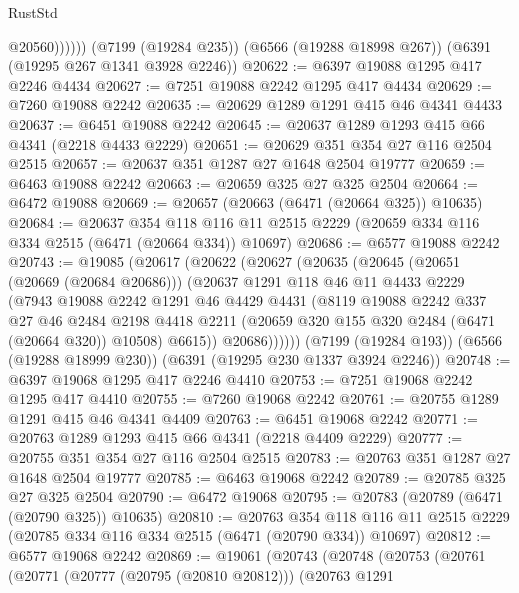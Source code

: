 \begin{lexlean}{RustStd}
\begin{coremodule}
                @20560))))))
    (@7199 (@19284 @235))
    (@6566 (@19288 @18998 @267))
    (@6391 (@19295 @267 @1341 @3928 @2246))
@20622 := @6397 @19088 @1295 @417 @2246 @4434
@20627 := @7251 @19088 @2242 @1295 @417 @4434
@20629 := @7260 @19088 @2242
@20635 := @20629 @1289 @1291 @415 @46 @4341 @4433
@20637 := @6451 @19088 @2242
@20645 := @20637 @1289 @1293 @415 @66 @4341 (@2218 @4433 @2229)
@20651 := @20629 @351 @354 @27 @116 @2504 @2515
@20657 := @20637 @351 @1287 @27 @1648 @2504 @19777
@20659 := @6463 @19088 @2242
@20663 := @20659 @325 @27 @325 @2504
@20664 := @6472 @19088
@20669 := @20657 (@20663 (@6471 (@20664 @325)) @10635)
@20684 := @20637
    @354
    @118
    @116
    @11
    @2515
    @2229
    (@20659 @334 @116 @334 @2515 (@6471 (@20664 @334)) @10697)
@20686 := @6577 @19088 @2242
@20743 := @19085
    (@20617
      (@20622
        (@20627
          (@20635
            (@20645
              (@20651 (@20669 (@20684 @20686)))
              (@20637
                @1291
                @118
                @46
                @11
                @4433
                @2229
                (@7943
                  @19088
                  @2242
                  @1291
                  @46
                  @4429
                  @4431
                  (@8119
                    @19088
                    @2242
                    @337
                    @27
                    @46
                    @2484
                    @2198
                    @4418
                    @2211
                    (@20659 @320 @155 @320 @2484 (@6471 (@20664 @320)) @10508)
                    @6615))
                @20686))))))
    (@7199 (@19284 @193))
    (@6566 (@19288 @18999 @230))
    (@6391 (@19295 @230 @1337 @3924 @2246))
@20748 := @6397 @19068 @1295 @417 @2246 @4410
@20753 := @7251 @19068 @2242 @1295 @417 @4410
@20755 := @7260 @19068 @2242
@20761 := @20755 @1289 @1291 @415 @46 @4341 @4409
@20763 := @6451 @19068 @2242
@20771 := @20763 @1289 @1293 @415 @66 @4341 (@2218 @4409 @2229)
@20777 := @20755 @351 @354 @27 @116 @2504 @2515
@20783 := @20763 @351 @1287 @27 @1648 @2504 @19777
@20785 := @6463 @19068 @2242
@20789 := @20785 @325 @27 @325 @2504
@20790 := @6472 @19068
@20795 := @20783 (@20789 (@6471 (@20790 @325)) @10635)
@20810 := @20763
    @354
    @118
    @116
    @11
    @2515
    @2229
    (@20785 @334 @116 @334 @2515 (@6471 (@20790 @334)) @10697)
@20812 := @6577 @19068 @2242
@20869 := @19061
    (@20743
      (@20748
        (@20753
          (@20761
            (@20771
              (@20777 (@20795 (@20810 @20812)))
              (@20763
                @1291

\end{coremodule}
\end{lexlean}

